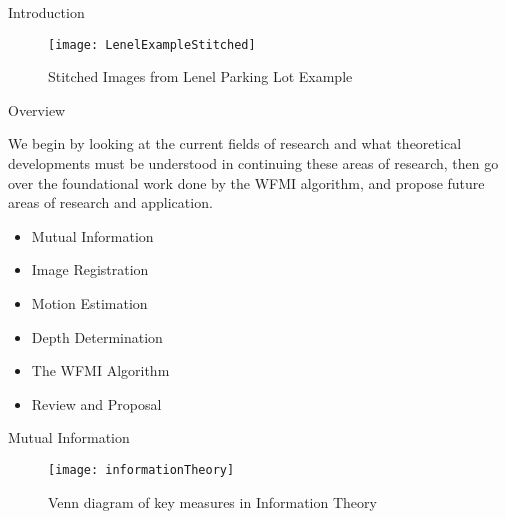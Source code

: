 \documentclass{beamer}
\begin{document}
\begin{frame}[c]{\sc Introduction}
\begin{center}

\begin{figure}[!h]
\centering
\texttt{[image: LenelExampleStitched]}
\caption{Stitched Images from Lenel Parking Lot Example}
\label{LenelExampleStitched}
\end{figure}

\end{center}
\end{frame}



\begin{frame}[t]{\sc Overview}
\begin{center}
We begin by looking at the current fields of research and what theoretical developments must be understood in continuing these areas of research, then go over the foundational work done by the WFMI algorithm, and propose future areas of research and application.
\end{center}

\begin{itemize}
\item Mutual Information
\item Image Registration
\item Motion Estimation
\item Depth Determination
\item The WFMI Algorithm
\item Review and Proposal
\end{itemize}
\end{frame}




\begin{frame}[c]{\sc Mutual Information}

\begin{figure}
\centering
\texttt{[image: informationTheory]}
\caption{Venn diagram of key measures in Information Theory}
\label{infoTheory}
\end{figure}


\end{frame}
\end{document}
